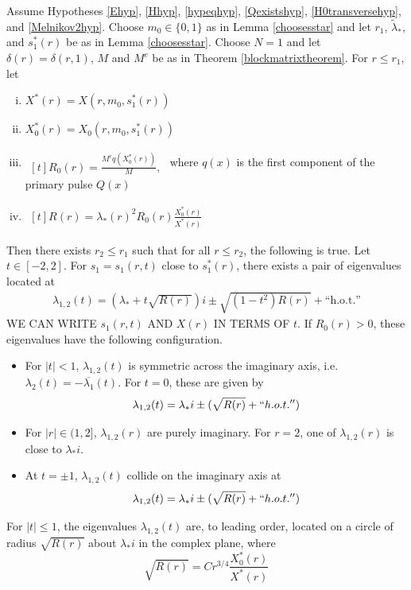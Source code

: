 \documentclass[thesis.tex]{subfiles}
\begin{document}
\begin{theorem}\label{theorem:kreinbubbles}
Assume Hypotheses \ref{Ehyp}, \ref{Hhyp}, \ref{hypeqhyp}, \ref{Qexistshyp}, \ref{H0transversehyp}, and \ref{Melnikov2hyp}. Choose $m_0 \in \{0, 1\}$ as in Lemma \ref{choosesstar} and let $r_1$, $\tilde{\lambda}_*$, and $s_1^*(r)$ be as in Lemma \ref{choosesstar}. Choose $N = 1$ and let $\delta(r) = \delta(r,1)$, $M$ and $M^c$ be as in Theorem \ref{blockmatrixtheorem}. For $r \leq r_1$, let
\begin{enumerate}[(i)]
\item $X^*(r) = X(r, m_0, s_1^*(r))$ 
\item $X_0^*(r) = X_0(r, m_0, s_1^*(r))$
\item
$
\begin{aligned}[t]
R_0(r) = \frac{M^c q(X_0^*(r))}{M},
\end{aligned}
$
where $q(x)$ is the first component of the primary pulse $Q(x)$
\item
$
\begin{aligned}[t]
R(r) = \lambda_*(r)^2 R_0(r) \frac{X_0^*(r)}{X^*(r)}
\end{aligned}
$
\end{enumerate}

Then there exists $r_2 \leq r_1$ such that for all $r \leq r_2$, the following is true. Let $t \in [-2, 2]$. For $s_1 = s_1(r, t)$ close to $s_1^*(r)$, there exists a pair of eigenvalues located at
\begin{align*}
\lambda_{1,2}(t) = \left( \lambda_* + t \sqrt{R(r)} \right) i \pm \sqrt{(1 - t^2)R(r)} + \text{``h.o.t.''}
\end{align*}
WE CAN WRITE $s_1(r, t)$ AND $X(r)$ IN TERMS OF $t$. If $R_0(r) > 0$, these eigenvalues have the following configuration.
\begin{itemize}
\item For $|t| < 1$, $\lambda_{1,2}(t)$ is symmetric across the imaginary axis, i.e. $\lambda_2(t) = -\overline{\lambda_1}(t)$. For $t = 0$, these are given by
\[
\lambda_{1,2}(t) = \lambda_* i \pm (\sqrt{R(r)} + ``h.o.t.'')
\]
\item For $|r| \in (1, 2]$, $\lambda_{1,2}(r)$
are purely imaginary. For $r = 2$, one of $\lambda_{1,2}(r)$ is close to $\lambda_* i$.

\item At $t = \pm 1$, $\lambda_{1,2}(t)$ collide on the imaginary axis at 
\[
\lambda_{1,2}(t) = \lambda_* i \pm (\sqrt{R(r)} + ``h.o.t.'')
\]
\end{itemize}
For $|t| \leq 1$, the eigenvalues $\lambda_{1,2}(t)$ are, to leading order, located on a circle of radius $\sqrt{R(r)}$ about $\lambda_* i$ in the complex plane, where
\[
\sqrt{R(r)} = C r^{3/4}\frac{X_0^*(r)}{X^*(r)}
\]
\end{theorem}
\end{document}

